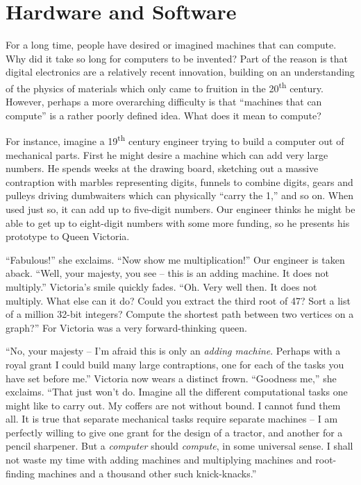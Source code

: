 \chapter{Hardware and Software}

For a long time, people have desired or imagined machines that can compute. Why did it take so long for computers to be invented? Part of the reason is that digital electronics are a relatively recent innovation, building on an understanding of the physics of materials which only came to fruition in the 20\textsuperscript{th} century. However, perhaps a more overarching difficulty is that ``machines that can compute'' is a rather poorly defined idea. What does it mean to compute?

For instance, imagine a 19\textsuperscript{th} century engineer trying to build a computer out of mechanical parts. First he might desire a machine which can add very large numbers. He spends weeks at the drawing board, sketching out a massive contraption with marbles representing digits, funnels to combine digits, gears and pulleys driving dumbwaiters which can physically ``carry the 1,'' and so on. When used just so, it can add up to five-digit numbers. Our engineer thinks he might be able to get up to eight-digit numbers with some more funding, so he presents his prototype to Queen Victoria.

``Fabulous!'' she exclaims. ``Now show me multiplication!'' Our engineer is taken aback. ``Well, your majesty, you see -- this is an adding machine. It does not multiply.'' Victoria's smile quickly fades. ``Oh. Very well then. It does not multiply. What else can it do? Could you extract the third root of 47? Sort a list of a million 32-bit integers? Compute the shortest path between two vertices on a graph?'' For Victoria was a very forward-thinking queen.

``No, your majesty -- I'm afraid this is only an \emph{adding machine}. Perhaps with a royal grant I could build many large contraptions, one for each of the tasks you have set before me.'' Victoria now wears a distinct frown. ``Goodness me,'' she exclaims. ``That just won't do. Imagine all the different computational tasks one might like to carry out. My coffers are not without bound. I cannot fund them all. It is true that separate mechanical tasks require separate machines -- I am perfectly willing to give one grant for the design of a tractor, and another for a pencil sharpener. But a \emph{computer} should \emph{compute}, in some universal sense. I shall not waste my time with adding machines and multiplying machines and root-finding machines and a thousand other such knick-knacks.''

